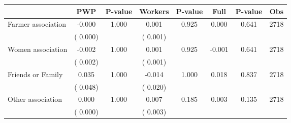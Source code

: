
\begin{tabular}{l*{7}{c}}\hline&\multicolumn{1}{c}{PWP}&\multicolumn{1}{c}{P-value}&\multicolumn{1}{c}{Workers}&\multicolumn{1}{c}{P-value}&\multicolumn{1}{c}{Full}&\multicolumn{1}{c}{P-value}&\multicolumn{1}{c}{Obs} \\ \hline

 Farmer association       &             -0.000       &        1.000  &              0.001       &        0.925  &              0.000       &              0.641 &  2718 \\ 
                       &       (       0.000)             &                               &       (       0.001)                     &                               &                                               &                                &                      \\ 

 Women association       &             -0.002       &        1.000  &              0.001       &        0.925  &             -0.001       &              0.641 &  2718 \\ 
                       &       (       0.002)             &                               &       (       0.001)                     &                               &                                               &                                &                      \\ 

 Friends or Family       &              0.035       &        1.000  &             -0.014       &        1.000  &              0.018       &              0.837 &  2718 \\ 
                       &       (       0.048)             &                               &       (       0.020)                     &                               &                                               &                                &                      \\ 

 Other association       &              0.000       &        1.000  &              0.007       &        0.185  &              0.003       &              0.135 &  2718 \\ 
                       &       (       0.000)             &                               &       (       0.003)                     &                               &                                               &                                &                      \\ 


\end{tabular}
